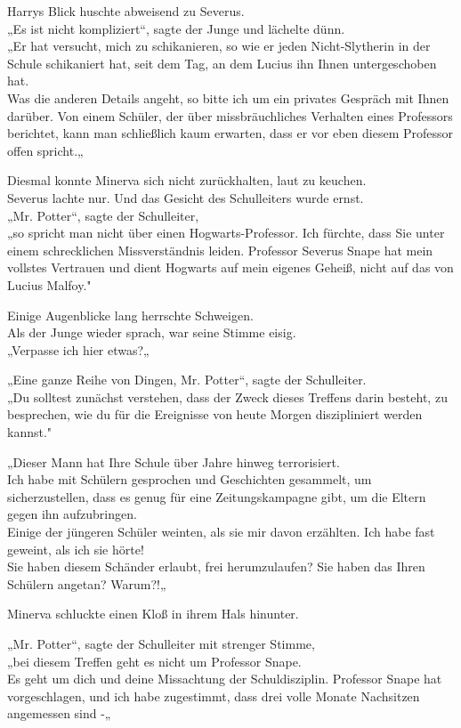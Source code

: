 {Harrys Blick huschte abweisend zu Severus.\\ „Es ist nicht kompliziert“, sagte der Junge und lächelte dünn.\\ „Er hat versucht, mich zu schikanieren, so wie er jeden Nicht-Slytherin in der Schule schikaniert hat, seit dem Tag, an dem Lucius ihn Ihnen untergeschoben hat.\\ Was die anderen Details angeht, so bitte ich um ein privates Gespräch mit Ihnen darüber. Von einem Schüler, der über missbräuchliches Verhalten eines Professors berichtet, kann man schließlich kaum erwarten, dass er vor eben diesem Professor offen spricht.„

Diesmal konnte Minerva sich nicht zurückhalten, laut zu keuchen.\\ Severus lachte nur. Und das Gesicht des Schulleiters wurde ernst.\\ „Mr. Potter“, sagte der Schulleiter,\\ „so spricht man nicht über einen Hogwarts-Professor. Ich fürchte, dass Sie unter einem schrecklichen Missverständnis leiden. Professor Severus Snape hat mein vollstes Vertrauen und dient Hogwarts auf mein eigenes Geheiß, nicht auf das von Lucius Malfoy."

Einige Augenblicke lang herrschte Schweigen.\\ Als der Junge wieder sprach, war seine Stimme eisig.\\ „Verpasse ich hier etwas?„

„Eine ganze Reihe von Dingen, Mr. Potter“, sagte der Schulleiter.\\ „Du solltest zunächst verstehen, dass der Zweck dieses Treffens darin besteht, zu besprechen, wie du für die Ereignisse von heute Morgen diszipliniert werden kannst."

„Dieser Mann hat Ihre Schule über Jahre hinweg terrorisiert.\\ Ich habe mit Schülern gesprochen und Geschichten gesammelt, um sicherzustellen, dass es genug für eine Zeitungskampagne gibt, um die Eltern gegen ihn aufzubringen.\\ Einige der jüngeren Schüler weinten, als sie mir davon erzählten. Ich habe fast geweint, als ich sie hörte!\\ Sie haben diesem Schänder erlaubt, frei herumzulaufen? Sie haben das Ihren Schülern angetan? Warum?!„

Minerva schluckte einen Kloß in ihrem Hals hinunter.

„Mr. Potter“, sagte der Schulleiter mit strenger Stimme,\\ „bei diesem Treffen geht es nicht um Professor Snape.\\ Es geht um dich und deine Missachtung der Schuldisziplin. Professor Snape hat vorgeschlagen, und ich habe zugestimmt, dass drei volle Monate Nachsitzen angemessen sind -„

}
